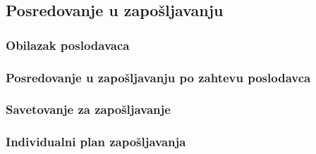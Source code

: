 \subsection{Posredovanje u zapo\v sljavanju}

\subsubsection{Obilazak poslodavaca}

\subsubsection{Posredovanje u zapo\v sljavanju po zahtevu poslodavca}

\subsubsection{Savetovanje za zapo\v sljavanje}

\subsubsection{Individualni plan zapo\v sljavanja}